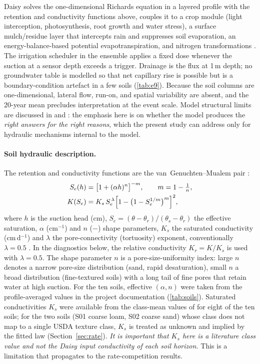 \documentclass[preprint,12pt,authoryear]{elsarticle}
\begin{document}
Daisy solves the one-dimensional Richards equation in a layered profile with the retention and conductivity functions above, couples it to a crop module (light interception, photosynthesis, root growth and water stress), a surface mulch/residue layer that intercepts rain and suppresses soil evaporation, an energy-balance-based potential evapotranspiration, and nitrogen transformations \citep{Hansen1991,Hansen2012,Holbak2026}. The irrigation scheduler in the ensemble applies a fixed dose whenever the suction at a sensor depth exceeds a trigger. Drainage is the flux at 1\,m depth; no groundwater table is modelled so that net capillary rise is possible but is a boundary-condition artefact in a few soils (\cref{tab:e9}). Because the soil columns are one-dimensional, lateral flow, run-on, and spatial variability are absent, and the 20-year mean precludes interpretation at the event scale. Model structural limits are discussed in \citet{Refsgaard2004} and \citet{Kirchner2006}: the emphasis here is on whether the model produces the \emph{right answers for the right reasons}, which the present study can address only for hydraulic mechanisms internal to the model.

\paragraph{Soil hydraulic description.}
The retention and conductivity functions are the van~Genuchten--Mualem pair \citep{vanGenuchten1980,Mualem1976}:
\begin{align}
S_e(h) &= \bigl[1+(\alpha h)^{n}\bigr]^{-m}, \qquad m = 1-\tfrac{1}{n},\label{eq:vg}\\
K(S_e) &= K_s\, S_e^{\,\lambda}\Bigl[1-\bigl(1-S_e^{1/m}\bigr)^{m}\Bigr]^{2},\label{eq:mualem}
\end{align}
where $h$ is the suction head (cm), $S_e=(\theta-\theta_r)/(\theta_s-\theta_r)$ the effective saturation, $\alpha$ (cm$^{-1}$) and $n$ ($-$) shape parameters, $K_s$ the saturated conductivity (cm\,d$^{-1}$) and $\lambda$ the pore-connectivity (tortuosity) exponent, conventionally $\lambda=0.5$ \citep{Mualem1976}. In the diagnostics below, the relative conductivity $K_r=K/K_s$ is used with $\lambda=0.5$. The shape parameter $n$ is a pore-size-uniformity index: large $n$ denotes a narrow pore-size distribution (sand, rapid desaturation), small $n$ a broad distribution (fine-textured soils) with a long tail of fine pores that retain water at high suction. For the ten soils, effective $(\alpha,n)$ were taken from the profile-averaged values in the project documentation (\cref{tab:soils}). Saturated conductivities $K_s$ were available from the class-mean values of \citet{Carsel1988} for eight of the ten soils; for the two soils (S01 coarse loam, S02 coarse sand) whose class does not map to a single USDA texture class, $K_s$ is treated as unknown and implied by the fitted law (Section~\ref{sec:rate}). \emph{It is important that $K_s$ here is a literature class value and not the Daisy input conductivity of each soil horizon.} This is a limitation that propagates to the rate-competition results.
\end{document}
